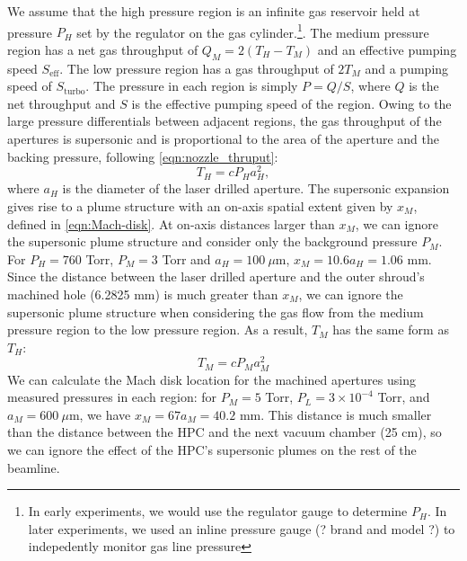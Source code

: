 We assume that the high pressure region is an infinite gas reservoir held at pressure $P_H$ set by the regulator on the gas cylinder.\footnote{In early experiments, we would use the regulator gauge to determine $P_H$. In later experiments, we used an inline pressure gauge (? brand and model ?) to indepedently monitor gas line pressure}. The medium pressure region has a net gas throughput of $Q_M = 2(T_H - T_M)$ and an effective pumping speed $S_{\textrm{eff}}$. The low pressure region has a gas throughput of $2T_M$ and a pumping speed of $S_{\textrm{turbo}}$. The pressure in each region is simply $P = Q / S$, where $Q$ is the net throughput and $S$ is the effective pumping speed of the region. Owing to the large pressure differentials between adjacent regions, the gas throughput of the apertures is supersonic and is proportional to the area of the aperture and the backing pressure, following \cref{eqn:nozzle_thruput}:
\begin{equation}
T_H = c P_H a_H^2,
\end{equation}
where $a_H$ is the diameter of the laser drilled aperture. The supersonic expansion gives rise to a plume structure with an on-axis spatial extent given by $x_M$, defined in \cref{eqn:Mach-disk}. At on-axis distances larger than $x_M$, we can ignore the supersonic plume structure and consider only the background pressure $P_M$. For $P_H = 760$ Torr, $P_M = 3$ Torr and $a_H = 100 \ \mu$m, $x_M = 10.6 a_H = 1.06$ mm. Since the distance between the laser drilled aperture and the outer shroud's machined hole (6.2825 mm) is much greater than $x_M$, we can ignore the supersonic plume structure when considering the gas flow from the medium pressure region to the low pressure region. As a result, $T_M$ has the same form as $T_H$:
\begin{equation}
T_M = c P_M a_M^2
\end{equation}
We can calculate the Mach disk location for the machined apertures using measured pressures in each region: for $P_M = 5$ Torr, $P_L = 3 \times 10^{-4}$ Torr, and $a_M = 600 \ \mu$m, we have $x_M = 67 a_M = 40.2$ mm. This distance is much smaller than the distance between the HPC and the next vacuum chamber (25 cm), so we can ignore the effect of the HPC's supersonic plumes on the rest of the beamline.

